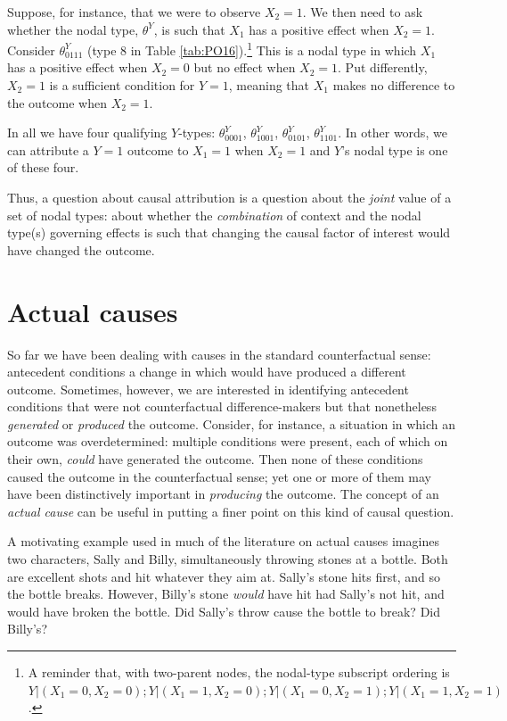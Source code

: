 \documentclass[
  12pt,
]{book}
\begin{document}
Suppose, for instance, that we were to observe \(X_2=1\). We then need to ask whether the nodal type, \(\theta^Y\), is such that \(X_1\) has a positive effect when \(X_2=1\). Consider \(\theta^Y_{0111}\) (type 8 in Table \ref{tab:PO16}).\footnote{A reminder that, with two-parent nodes, the nodal-type subscript ordering is \(Y|(X_1=0, X_2=0); Y|(X_1=1, X_2=0); Y|(X_1=0, X_2=1); Y|(X_1=1, X_2=1)\).} This is a nodal type in which \(X_1\) has a positive effect when \(X_2=0\) but no effect when \(X_2=1\). Put differently, \(X_2=1\) is a sufficient condition for \(Y=1\), meaning that \(X_1\) makes no difference to the outcome when \(X_2=1\).

In all we have four qualifying \(Y\)-types: \(\theta^Y_{0001}\), \(\theta^Y_{1001}\), \(\theta^Y_{0101}\), \(\theta^Y_{1101}\). In other words, we can attribute a \(Y=1\) outcome to \(X_1=1\) when \(X_2=1\) and \(Y\)'s nodal type is one of these four.

Thus, a question about causal attribution is a question about the \emph{joint} value of a set of nodal types: about whether the \emph{combination} of context and the nodal type(s) governing effects is such that changing the causal factor of interest would have changed the outcome.

\hypertarget{actual-causes}{%
\section{Actual causes}\label{actual-causes}}

So far we have been dealing with causes in the standard counterfactual sense: antecedent conditions a change in which would have produced a different outcome. Sometimes, however, we are interested in identifying antecedent conditions that were not counterfactual difference-makers but that nonetheless \emph{generated} or \emph{produced} the outcome. Consider, for instance, a situation in which an outcome was overdetermined: multiple conditions were present, each of which on their own, \emph{could} have generated the outcome. Then none of these conditions caused the outcome in the counterfactual sense; yet one or more of them may have been distinctively important in \emph{producing} the outcome. The concept of an \emph{actual cause} can be useful in putting a finer point on this kind of causal question.

A motivating example used in much of the literature on actual causes \citep[e.g.][]{hall2004two} imagines two characters, Sally and Billy, simultaneously throwing stones at a bottle. Both are excellent shots and hit whatever they aim at. Sally's stone hits first, and so the bottle breaks. However, Billy's stone \emph{would} have hit had Sally's not hit, and would have broken the bottle. Did Sally's throw cause the bottle to break? Did Billy's?
\end{document}
